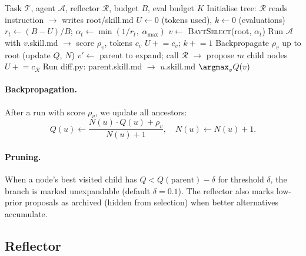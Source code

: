 \documentclass{article}
\begin{document}
\begin{algorithm}[t]
\caption{FIRE-Bench Budget-Adaptive Tree Search}
\label{alg:search}
\begin{algorithmic}[1]
\REQUIRE Task $\mathcal{T}$, agent $\mathcal{A}$, reflector $\mathcal{R}$, budget $B$, eval budget $K$
\STATE Initialise tree: $\mathcal{R}$ reads instruction $\to$ writes root/skill.md
\STATE $U \leftarrow 0$ (tokens used), $k \leftarrow 0$ (evaluations)
    \STATE $r_t \leftarrow (B - U)/B$; \quad $\alpha_t \leftarrow \min(1/r_t,\; \alpha_{\max})$
    \STATE $v \leftarrow$ \textsc{BavtSelect}(root, $\alpha_t$) \hfill {}
        \STATE Run $\mathcal{A}$ with $v$.skill.md $\to$ score $\rho_v$, tokens $c_v$
        \STATE $U \mathrel{+}= c_v$; \quad $k \mathrel{+}= 1$
        \STATE Backpropagate $\rho_v$ up to root (update $Q$, $N$)
    \ELSE
        \STATE $v' \leftarrow$ parent to expand; call $\mathcal{R}$ $\to$ propose $m$ child nodes
        \STATE $U \mathrel{+}= c_{\mathcal{R}}$
            \STATE Run diff.py: parent.skill.md $\to$ $u$.skill.md
        \ENDFOR
    \ENDIF
\ENDWHILE
\RETURN $\argmax_{v} Q(v)$
\end{algorithmic}
\end{algorithm}

\paragraph{Backpropagation.}
After a run with score $\rho_v$, we update all ancestors:
\[
    Q(u) \leftarrow \frac{N(u) \cdot Q(u) + \rho_v}{N(u) + 1}, \quad N(u) \leftarrow N(u) + 1.
\]

\paragraph{Pruning.}
When a node's best visited child has $Q < Q(\text{parent}) - \delta$ for threshold $\delta$, the branch is marked unexpandable (default $\delta=0.1$).
The reflector also marks low-prior proposals as archived (hidden from selection) when better alternatives accumulate.

\subsection{Reflector}
\end{document}
